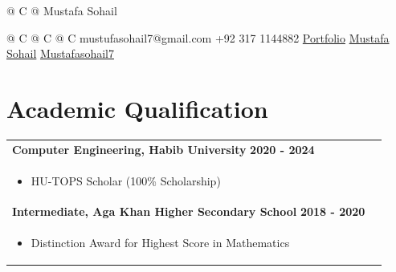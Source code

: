 \documentclass[a4paper,8pt]{article}
\begin{document}
\pagestyle{empty} 

\begin{tabularx}{\linewidth}{@{} C @{}}
\Huge{Mustafa Sohail} \\[6pt]
\end{tabularx}

\begin{tabularx}{\linewidth}{@{} C @{} C @{} C}
{{\raisebox{-0.05\height}{\faEnvelope} mustufasohail7@gmail.com}} 
{{\raisebox{-0.05\height}{\faMobile} +92 317 1144882}} 
{{\href{https://mustafasohail7.github.io}{\raisebox{-0.05\height}{\faGlobe} Portfolio}}}
{{\href{https://www.linkedin.com/in/mustafa-sohail-187ab4206/}{\raisebox{-0.05\height}{\faLinkedin} Mustafa Sohail}}}
{{\href{https://github.com/Mustafasohail7}{\raisebox{-0.05\height}{\faGithub} Mustafasohail7}}}
\end{tabularx}

\section{\textbf{Academic Qualification}}
\begin{tabularx}{\linewidth}{ @{}l r@{}}
\textbf{Computer Engineering, Habib University} \hfill \textbf{2020 - 2024} \\[4pt]
\begin{minipage}[t]{\linewidth}
    \begin{itemize}[nosep, after=\strut, leftmargin=1em, itemsep=2pt]
        \item HU-TOPS Scholar (100\% Scholarship)
    \end{itemize}
\end{minipage} \\[4pt]


\textbf{Intermediate, Aga Khan Higher Secondary School} \hfill \textbf{2018 - 2020}\\[4pt]
\begin{minipage}[t]{\linewidth}
    \begin{itemize}[nosep, after=\strut, leftmargin=1em, itemsep=2pt]
        \item Distinction Award for Highest Score in Mathematics
    \end{itemize}
\end{minipage}
\end{tabularx}

\end{document}
